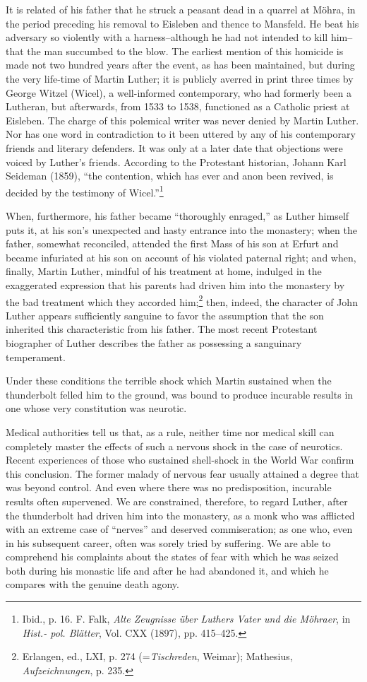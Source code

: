 It is related of his father that he struck a peasant dead in a
quarrel at Möhra, in the period preceding his removal to Eisleben
and thence to Mansfeld. He beat his adversary so violently with
a harness--although he had not intended to kill him--that the
man succumbed to the blow. The earliest mention of this homicide
is made not two hundred years after the event, as has been maintained,
but during the very life-time of Martin Luther; it is publicly averred
in print three times by George Witzel (Wicel), a well-informed
contemporary, who had formerly been a Lutheran, but afterwards,
from 1533 to 1538, functioned as a Catholic priest at Eisleben. The
charge of this polemical writer was never denied by Martin Luther.
Nor has one word in contradiction to it been uttered by any of his
contemporary friends and literary defenders. It was only at a later
date that objections were voiced by Luther’s friends. According to
the Protestant historian, Johann Karl Seideman (1859), “the contention,
which has ever and anon been revived, is decided by the testimony of Wicel.”\footnote
{Ibid., p. 16. F. Falk, \textit{Alte Zeugnisse über Luthers Vater und die Möhraer}, in \textit{Hist.- pol. Blätter}, Vol. CXX (1897), pp. 415--425.}

When, furthermore, his father became “thoroughly enraged,” as
Luther himself puts it, at his son’s unexpected and hasty entrance
into the monastery; when the father, somewhat reconciled, attended
the first Mass of his son at Erfurt and became infuriated at his
son on account of his violated paternal right; and when, finally,
Martin Luther, mindful of his treatment at home, indulged in the
exaggerated expression that his parents had driven him into the
monastery by the bad treatment which they accorded him;\footnote
{Erlangen, ed., LXI, p. 274 (=\textit{Tischreden}, Weimar); Mathesius, \textit{Aufzeichnungen}, p. 235.}
then, indeed, the character of John Luther appears sufficiently sanguine
to favor the assumption that the son inherited this characteristic
from his father. The most recent Protestant biographer of Luther
describes the father as possessing a sanguinary temperament.

Under these conditions the terrible shock which Martin sustained
when the thunderbolt felled him to the ground, was bound to produce
incurable results in one whose very constitution was neurotic.

Medical authorities tell us that, as a rule, neither time nor medical
skill can completely master the effects of such a nervous shock in
the case of neurotics. Recent experiences of those who sustained
shell-shock in the World War confirm this conclusion. The former
malady of nervous fear usually attained a degree that was beyond
control. And even where there was no predisposition, incurable
results often supervened. We are constrained, therefore, to regard
Luther, after the thunderbolt had driven him into the monastery,
as a monk who was afflicted with an extreme case of “nerves” and
deserved commiseration; as one who, even in his subsequent career,
often was sorely tried by suffering. We are able to comprehend his
complaints about the states of fear with which he was seized both
during his monastic life and after he had abandoned it, and which
he compares with the genuine death agony.

